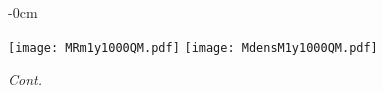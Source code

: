 \documentclass[universe,article,accept,moreauthors,pdftex]{Definitions/mdpi}
\begin{document}
\begin{figure}[H]

\begin{adjustwidth}{-\extralength}{0cm}
\centering %

{\texttt{[image: MRm1y1000QM.pdf]}\vspace{3pt}
	  \texttt{[image: MdensM1y1000QM.pdf]}}\\
\end{adjustwidth}
\caption{\emph{Cont.}}
\label{fig:MRdens1000QM}

\end{figure}
\end{document}

